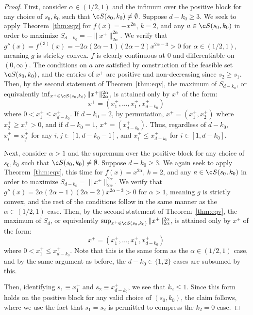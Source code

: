 \documentclass[11pt]{article}
\begin{document}
\begin{proof}
    First, consider $\alpha \in (1/2,1)$ and the infimum over the positive block for any choice of $s_0,k_0$ such that ${\c S}(s_0,k_0)\neq \emptyset$. Suppose $d-k_0\geq 3$. We seek to apply Theorem~\ref{thm:eqv} for $f(x)=-x^{2\alpha}$, $k=2$, and any $a\in {\c S}(s_0,k_0)$ in order to maximize $S_{d-k_0}=-\|x^+\|_{2\alpha}^{2\alpha}$. We verify that $g''(x)=f^{(3)}(x)=-2\alpha(2\alpha-1)(2\alpha-2)x^{2\alpha-3}>0$ for $\alpha \in (1/2,1)$, meaning $g$ is strictly convex. $f$ is clearly continuous at $0$ and differentiable on $(0,\infty)$. The conditions on $a$ are satisfied by construction of the feasible set ${\c S}(s_0,k_0)$, and the entries of $x^+$ are positive and non-decreasing since $s_2\geq s_1$. Then, by the second statement of Theorem~\ref{thm:eqv}, the maximum of $S_{d-k_0}$, or equivalently $\inf_{x^+\in {\c S}(s_0,k_0)}\|x^+\|_{2\alpha}^{2\alpha}$, is attained only by  $x^+$ of the form:
    $$x^+=(x^+_1,\dots,x_1^+,x_{d-k_0}^+)$$
    where $0< x_{1}^+\leq x_{d-k_0}^+$. If $d-k_0=2$, by permutation, $x^+=(x_1^+,x_{2}^+)$ where $x_{2}^+\geq x_1^+> 0$, and if $d-k_0=1$, $x^+=(x_{d-k_0}^+)$. Thus, regardless of $d-k_0$, $x^+_{i}=x_j^+$ for any $i,j\in [1,d-k_0-1]$, and $x^{+}_i\leq x^+_{d-k_0}$ for $i \in [1,d-k_0]$. 
    
    Next, consider $\alpha > 1$ and the supremum over the positive block for any choice of $s_0,k_0$ such that ${\c S}(s_0,k_0)\neq \emptyset$. Suppose $d-k_0\geq 3$. We again seek to apply Theorem~\ref{thm:eqv}, this time for $f(x)=x^{2\alpha}$, $k=2$, and any $a\in {\c S}(s_0,k_0)$ in order to maximize $S_{d-k_0}=\|x^+\|_{2\alpha}^{2\alpha}$. We verify that $g''(x)=2\alpha(2\alpha-1)(2\alpha-2)x^{2\alpha-3}>0$ for $\alpha > 1$, meaning $g$ is strictly convex, and the rest of the conditions follow in the same manner as the $\alpha \in (1/2,1)$ case. Then, by the second statement of Theorem~\ref{thm:eqv}, the maximum of $S_d$, or equivalently $\sup_{x^+\in {\c S}(s_0,k_0)}\|x^+\|_{2\alpha}^{2\alpha}$, is attained only by $x^+$ of the form:
    $$x^+=(x^+_1,\dots,x_1^+,x_{d-k_0}^+)$$
    where $0< x_{1}^+\leq x_{d-k_0}^+$. Note that this is the same form as the $\alpha \in (1/2,1)$ case, and by the same argument as before, the $d-k_0\in \{1,2\}$ cases are subsumed by this. 
    
    Then, identifying $s_1\equiv x_1^+$ and $s_2\equiv x_{d-k_0}^+$, we see that $k_2\leq 1$. Since this form holds on the positive block for any valid choice of $(s_0,k_0)$, the claim follows, where we use the fact that $s_1=s_2$ is permitted to compress the $k_2=0$ case.
\end{proof}
\end{document}
